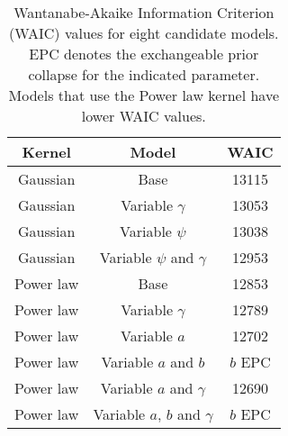 
\begin{table}
\begin{center}
\begin{tabular}{ccc} 
\toprule
Kernel    & Model                          & WAIC  \\ \midrule
Gaussian  & Base                           & 13115 \\
Gaussian  & Variable $\gamma$              & 13053 \\
Gaussian  & Variable $\psi$                & 13038 \\   
Gaussian  & Variable $\psi$ and $\gamma$   & 12953 \\
Power law & Base                           & 12853 \\
Power law & Variable $\gamma$              & 12789 \\
Power law & Variable $a$                   & 12702 \\
Power law & Variable $a$ and $b$           & $b$ EPC   \\
Power law & Variable $a$ and $\gamma$      & 12690 \\  
Power law & Variable $a$, $b$ and $\gamma$ & $b$ EPC   \\
\bottomrule
\end{tabular}
\caption{Wantanabe-Akaike Information Criterion (WAIC) values for
  eight candidate models. EPC denotes the exchangeable prior collapse
  for the indicated parameter. Models that use the Power law kernel
  have lower WAIC values.}
\end{center}
\label{table:WAIC}
\vspace{2cm}
\end{table}


